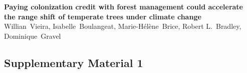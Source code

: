 \graphicspath{{chapter1/}{manuscript/}}

\chapter{\textbf{}}

\begin{center}
\textbf{Paying colonization credit with forest management could
accelerate the range shift of temperate trees under climate change} \\
Willian~Vieira, Isabelle~Boulangeat, Marie-Hélène~Brice, Robert
L.~Bradley, Dominique~Gravel
\end{center}

\hypertarget{supplementary-material-1}{%
\section{Supplementary Material 1}\label{supplementary-material-1}}

